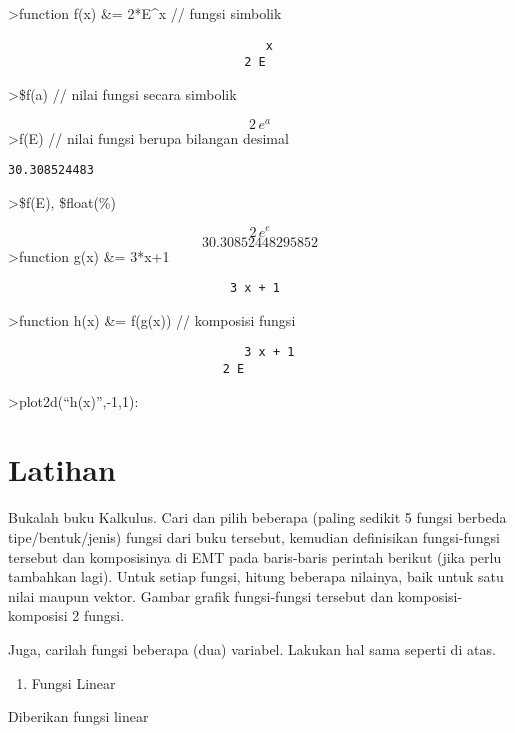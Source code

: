 \documentclass[
]{book}
\providecommand{\tightlist}{%
  \setlength{\itemsep}{0pt}\setlength{\parskip}{0pt}}
\begin{document}
\textgreater function f(x) \&= 2*E\^{}x // fungsi simbolik

\begin{verbatim}
                                    x
                                 2 E
\end{verbatim}

\textgreater\$f(a) // nilai fungsi secara simbolik

\[2\,e^{a}\]\textgreater f(E) // nilai fungsi berupa bilangan desimal

\begin{verbatim}
30.308524483
\end{verbatim}

\textgreater\$f(E), \$float(\%)

\[2\,e^{e}\]\[30.30852448295852\]\textgreater function g(x) \&= 3*x+1

\begin{verbatim}
                               3 x + 1
\end{verbatim}

\textgreater function h(x) \&= f(g(x)) // komposisi fungsi

\begin{verbatim}
                                 3 x + 1
                              2 E
\end{verbatim}

\textgreater plot2d(``h(x)'',-1,1):

\chapter{Latihan}\label{latihan}

Bukalah buku Kalkulus. Cari dan pilih beberapa (paling sedikit 5 fungsi berbeda tipe/bentuk/jenis) fungsi dari buku tersebut, kemudian definisikan fungsi-fungsi tersebut dan komposisinya di EMT pada baris-baris perintah berikut (jika perlu tambahkan lagi). Untuk setiap fungsi, hitung beberapa nilainya, baik untuk satu nilai maupun vektor. Gambar grafik fungsi-fungsi tersebut dan komposisi-komposisi 2 fungsi.

Juga, carilah fungsi beberapa (dua) variabel. Lakukan hal sama seperti di atas.

\begin{enumerate}
\def\labelenumi{\arabic{enumi}.}
\tightlist
\item
  Fungsi Linear
\end{enumerate}

Diberikan fungsi linear
\end{document}
